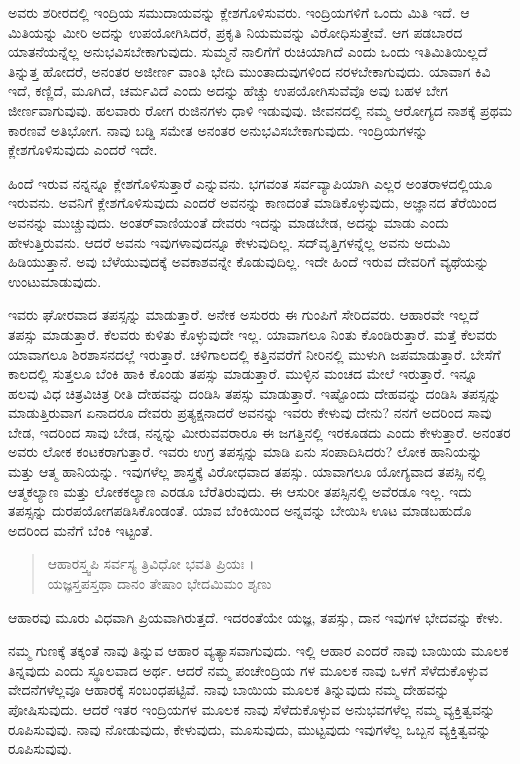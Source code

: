 ಅವರು ಶರೀರದಲ್ಲಿ ಇಂದ್ರಿಯ ಸಮುದಾಯವನ್ನು ಕ್ಲೇಶಗೊಳಿಸುವರು. ಇಂದ್ರಿಯಗಳಿಗೆ ಒಂದು ಮಿತಿ ಇದೆ. ಆ ಮಿತಿಯನ್ನು ಮೀರಿ ಅದನ್ನು ಉಪಯೋಗಿಸಿದರೆ, ಪ್ರಕೃತಿ ನಿಯಮವನ್ನು ವಿರೋಧಿಸುತ್ತೇವೆ. ಆಗ ಪಡಬಾರದ ಯಾತನೆಯನ್ನೆಲ್ಲ ಅನುಭವಿಸಬೇಕಾಗುವುದು. ಸುಮ್ಮನೆ ನಾಲಿಗೆಗೆ ರುಚಿಯಾಗಿದೆ ಎಂದು ಒಂದು ಇತಿಮಿತಿಯಿಲ್ಲದೆ ತಿನ್ನುತ್ತ ಹೋದರೆ, ಅನಂತರ ಅಜೀರ್ಣ ವಾಂತಿ ಭೇದಿ ಮುಂತಾದುವುಗಳಿಂದ ನರಳಬೇಕಾಗುವುದು. ಯಾವಾಗ ಕಿವಿ ಇದೆ, ಕಣ್ಣಿದೆ, ಮೂಗಿದೆ, ಚರ್ಮವಿದೆ ಎಂದು ಅದನ್ನು ಹೆಚ್ಚು ಉಪಯೋಗಿಸುವೆವೊ ಅವು ಬಹಳ ಬೇಗ ಜೀರ್ಣವಾಗುವುವು. ಹಲವಾರು ರೋಗ ರುಜಿನಗಳು ಧಾಳಿ ಇಡುವುವು. ಜೀವನದಲ್ಲಿ ನಮ್ಮ ಆರೋಗ್ಯದ ನಾಶಕ್ಕೆ ಪ್ರಥಮ ಕಾರಣವೆ ಅತಿಭೋಗ. ನಾವು ಬಡ್ಡಿ ಸಮೇತ ಅನಂತರ ಅನುಭವಿಸಬೇಕಾಗುವುದು. ಇಂದ್ರಿಯಗಳನ್ನು ಕ್ಲೇಶಗೊಳಿಸುವುದು ಎಂದರೆ ಇದೇ.

ಹಿಂದೆ ಇರುವ ನನ್ನನ್ನೂ ಕ್ಲೇಶಗೊಳಿಸುತ್ತಾರೆ ಎನ್ನುವನು. ಭಗವಂತ ಸರ್ವವ್ಯಾಪಿಯಾಗಿ ಎಲ್ಲರ ಅಂತರಾಳದಲ್ಲಿಯೂ ಇರುವನು. ಅವನಿಗೆ ಕ್ಲೇಶಗೊಳಿಸುವುದು ಎಂದರೆ ಅವನನ್ನು ಕಾಣದಂತೆ ಮಾಡಿಕೊಳ್ಳುವುದು, ಅಜ್ಞಾನದ ತೆರೆಯಿಂದ ಅವನನ್ನು ಮುಚ್ಚುವುದು. ಅಂತರ್​ವಾಣಿಯಂತೆ ದೇವರು ಇದನ್ನು ಮಾಡಬೇಡ, ಅದನ್ನು ಮಾಡು ಎಂದು ಹೇಳುತ್ತಿರುವನು. ಆದರೆ ಅವನು ಇವುಗಳಾವುದನ್ನೂ ಕೇಳುವುದಿಲ್ಲ. ಸದ್​ವೃತ್ತಿಗಳನ್ನೆಲ್ಲ ಅವನು ಅದುಮಿ ಹಿಡಿಯುತ್ತಾನೆ. ಅವು ಬೆಳೆಯುವುದಕ್ಕೆ ಅವಕಾಶವನ್ನೇ ಕೊಡುವುದಿಲ್ಲ. ಇದೇ ಹಿಂದೆ ಇರುವ ದೇವರಿಗೆ ವ್ಯಥೆಯನ್ನು ಉಂಟುಮಾಡುವುದು.

ಇವರು ಘೋರವಾದ ತಪಸ್ಸನ್ನು ಮಾಡುತ್ತಾರೆ. ಅನೇಕ ಅಸುರರು ಈ ಗುಂಪಿಗೆ ಸೇರಿದವರು. ಆಹಾರವೇ ಇಲ್ಲದೆ ತಪಸ್ಸು ಮಾಡುತ್ತಾರೆ. ಕೆಲವರು ಕುಳಿತು ಕೊಳ್ಳುವುದೇ ಇಲ್ಲ. ಯಾವಾಗಲೂ ನಿಂತು ಕೊಂಡಿರುತ್ತಾರೆ. ಮತ್ತೆ ಕೆಲವರು ಯಾವಾಗಲೂ ಶಿರಶಾಸನದಲ್ಲೆ ಇರುತ್ತಾರೆ. ಚಳಿಗಾಲದಲ್ಲಿ ಕತ್ತಿನವರೆಗೆ ನೀರಿನಲ್ಲಿ ಮುಳುಗಿ ಜಪಮಾಡುತ್ತಾರೆ. ಬೇಸೆಗೆ ಕಾಲದಲ್ಲಿ ಸುತ್ತಲೂ ಬೆಂಕಿ ಹಾಕಿ ಕೊಂಡು ತಪಸ್ಸು ಮಾಡುತ್ತಾರೆ. ಮುಳ್ಳಿನ ಮಂಚದ ಮೇಲೆ ಇರುತ್ತಾರೆ. ಇನ್ನೂ ಹಲವು ವಿಧ ಚಿತ್ರವಿಚಿತ್ರ ರೀತಿ ದೇಹವನ್ನು ದಂಡಿಸಿ ತಪಸ್ಸು ಮಾಡುತ್ತಾರೆ. ಇಷ್ಟೊಂದು ದೇಹವನ್ನು ದಂಡಿಸಿ ತಪಸ್ಸನ್ನು ಮಾಡುತ್ತಿರುವಾಗ ಏನಾದರೂ ದೇವರು ಪ್ರತ್ಯಕ್ಷನಾದರೆ ಅವನನ್ನು ಇವರು ಕೇಳುವು ದೇನು? ನನಗೆ ಅದರಿಂದ ಸಾವು ಬೇಡ, ಇದರಿಂದ ಸಾವು ಬೇಡ, ನನ್ನನ್ನು ಮೀರುವವರಾರೂ ಈ ಜಗತ್ತಿನಲ್ಲಿ ಇರಕೂಡದು ಎಂದು ಕೇಳುತ್ತಾರೆ. ಅನಂತರ ಅವರು ಲೋಕ ಕಂಟಕರಾಗುತ್ತಾರೆ. ಇವರು ಉಗ್ರ ತಪಸ್ಸನ್ನು ಮಾಡಿ ಏನು ಸಂಪಾದಿಸಿದರು? ಲೋಕ ಹಾನಿಯನ್ನು ಮತ್ತು ಆತ್ಮ ಹಾನಿಯನ್ನು. ಇವುಗಳೆಲ್ಲ ಶಾಸ್ತ್ರಕ್ಕೆ ವಿರೋಧವಾದ ತಪಸ್ಸು. ಯಾವಾಗಲೂ ಯೋಗ್ಯವಾದ ತಪಸ್ಸಿ ನಲ್ಲಿ ಆತ್ಮಕಲ್ಯಾಣ ಮತ್ತು ಲೋಕಕಲ್ಯಾಣ ಎರಡೂ ಬೆರೆತಿರುವುದು. ಈ ಆಸುರೀ ತಪಸ್ಸಿನಲ್ಲಿ ಅವೆರಡೂ ಇಲ್ಲ. ಇದು ತಪಸ್ಸನ್ನು ದುರಪಯೋಗಪಡಿಸಿಕೊಂಡಂತೆ. ಯಾವ ಬೆಂಕಿಯಿಂದ ಅನ್ನವನ್ನು ಬೇಯಿಸಿ ಊಟ ಮಾಡಬಹುದೊ ಅದರಿಂದ ಮನೆಗೆ ಬೆಂಕಿ ಇಟ್ಟಂತೆ.

\begin{verse}
ಆಹಾರಸ್ತ್ವಪಿ ಸರ್ವಸ್ಯ ತ್ರಿವಿಧೋ ಭವತಿ ಪ್ರಿಯಃ ।\\ಯಜ್ಞಸ್ತಪಸ್ತಥಾ ದಾನಂ ತೇಷಾಂ ಭೇದಮಿಮಂ ಶೃಣು 
\end{verse}

{\small ಆಹಾರವು ಮೂರು ವಿಧವಾಗಿ ಪ್ರಿಯವಾಗಿರುತ್ತದೆ. ಇದರಂತೆಯೇ ಯಜ್ಞ, ತಪಸ್ಸು, ದಾನ ಇವುಗಳ ಭೇದವನ್ನು ಕೇಳು.}

ನಮ್ಮ ಗುಣಕ್ಕೆ ತಕ್ಕಂತೆ ನಾವು ತಿನ್ನುವ ಆಹಾರ ವ್ಯತ್ಯಾಸವಾಗುವುದು. ಇಲ್ಲಿ ಆಹಾರ ಎಂದರೆ ನಾವು ಬಾಯಿಯ ಮೂಲಕ ತಿನ್ನವುದು ಎಂದು ಸ್ಥೂಲವಾದ ಅರ್ಥ. ಆದರೆ ನಮ್ಮ ಪಂಚೇಂದ್ರಿಯ ಗಳ ಮೂಲಕ ನಾವು ಒಳಗೆ ಸೆಳೆದುಕೊಳ್ಳುವ ವೇದನೆಗಳೆಲ್ಲವೂ ಆಹಾರಕ್ಕೆ ಸಂಬಂಧಪಟ್ಟಿವೆ. ನಾವು ಬಾಯಿಯ ಮೂಲಕ ತಿನ್ನುವುದು ನಮ್ಮ ದೇಹವನ್ನು ಪೋಷಿಸುವುದು. ಆದರೆ ಇತರ ಇಂದ್ರಿಯಗಳ ಮೂಲಕ ನಾವು ಸೆಳೆದುಕೊಳ್ಳುವ ಅನುಭವಗಳೆಲ್ಲ ನಮ್ಮ ವ್ಯಕ್ತಿತ್ವವನ್ನು ರೂಪಿಸುವುವು. ನಾವು ನೋಡುವುದು, ಕೇಳುವುದು, ಮೂಸುವುದು, ಮುಟ್ಟವುದು ಇವುಗಳೆಲ್ಲ ಒಬ್ಬನ ವ್ಯಕ್ತಿತ್ವವನ್ನು ರೂಪಿಸುವುವು.

